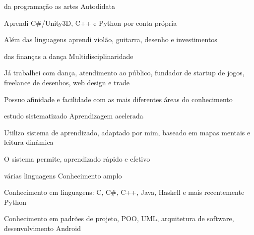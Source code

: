 

\begin{cventries}

	\cventry
	    {da programação as artes} %
	    {Autodidata} %
	    {} %
	    {} %
	    {
	      \begin{cvitems} %
	        \item {Aprendi C\#/Unity3D, C++ e Python por conta própria}
	        \item {Além das linguagens aprendi violão, guitarra, desenho e investimentos}
	      \end{cvitems}
	    }


	\cventry
		{das finanças a dança} %
		{Multidisciplinaridade} %
		{} %
		{} %
		{
			\begin{cvitems} %
				\item {Já trabalhei com dança, atendimento ao público, fundador de startup de jogos, freelance de desenhos, web design e trade}
				\item {Possuo afinidade e facilidade com as mais diferentes áreas do conhecimento}
			\end{cvitems}
		}


	\cventry
		{estudo sistematizado} %
		{Aprendizagem acelerada} %
		{} %
		{} %
		{
			\begin{cvitems} %
				\item {Utilizo sistema de aprendizado, adaptado por mim, baseado em mapas mentais e leitura dinâmica}
				\item {O sistema permite, aprendizado rápido e efetivo}
			\end{cvitems}
		}


	\cventry
		{várias linguagens} %
		{Conhecimento amplo} %
		{} %
		{} %
		{
			\begin{cvitems} %
				\item {Conhecimento em linguagens: C, C\#, C++, Java, Haskell e mais recentemente Python}
				\item {Conhecimento em padrões de projeto, POO, UML, arquitetura de software, desenvolvimento Android}
			\end{cvitems}
		}



\end{cventries}

